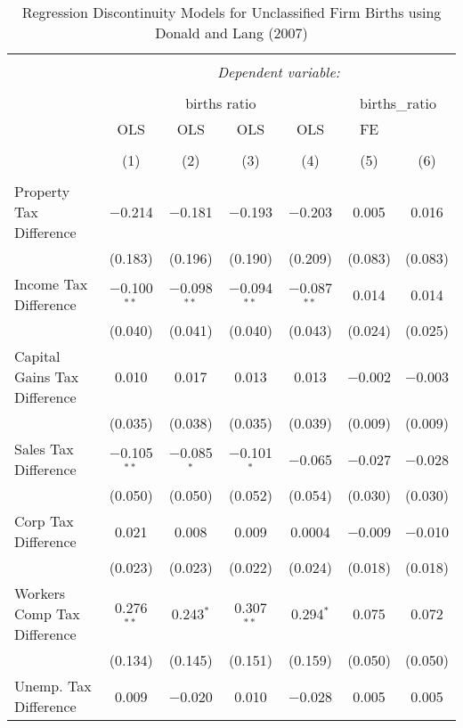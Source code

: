 
\begin{table}[!htbp] \centering 
  \caption{Regression Discontinuity Models for  Unclassified Firm Births using Donald and Lang (2007)} 
  \label{} 
\begin{tabular}{@{\extracolsep{5pt}}lcccccc} 
\\[-1.8ex]\hline 
\hline \\[-1.8ex] 
 & \multicolumn{6}{c}{\textit{Dependent variable:}} \\ 
\cline{2-7} 
\\[-1.8ex] & \multicolumn{4}{c}{births ratio} & \multicolumn{2}{c}{births\_ratio} \\ 
 & OLS & OLS & OLS & OLS & FE &  \\ 
\\[-1.8ex] & (1) & (2) & (3) & (4) & (5) & (6)\\ 
\hline \\[-1.8ex] 
 Property Tax Difference & $-$0.214 & $-$0.181 & $-$0.193 & $-$0.203 & 0.005 & 0.016 \\ 
  & (0.183) & (0.196) & (0.190) & (0.209) & (0.083) & (0.083) \\ 
  Income Tax Difference & $-$0.100$^{**}$ & $-$0.098$^{**}$ & $-$0.094$^{**}$ & $-$0.087$^{**}$ & 0.014 & 0.014 \\ 
  & (0.040) & (0.041) & (0.040) & (0.043) & (0.024) & (0.025) \\ 
  Capital Gains Tax Difference & 0.010 & 0.017 & 0.013 & 0.013 & $-$0.002 & $-$0.003 \\ 
  & (0.035) & (0.038) & (0.035) & (0.039) & (0.009) & (0.009) \\ 
  Sales Tax Difference & $-$0.105$^{**}$ & $-$0.085$^{*}$ & $-$0.101$^{*}$ & $-$0.065 & $-$0.027 & $-$0.028 \\ 
  & (0.050) & (0.050) & (0.052) & (0.054) & (0.030) & (0.030) \\ 
  Corp Tax Difference & 0.021 & 0.008 & 0.009 & 0.0004 & $-$0.009 & $-$0.010 \\ 
  & (0.023) & (0.023) & (0.022) & (0.024) & (0.018) & (0.018) \\ 
  Workers Comp Tax Difference & 0.276$^{**}$ & 0.243$^{*}$ & 0.307$^{**}$ & 0.294$^{*}$ & 0.075 & 0.072 \\ 
  & (0.134) & (0.145) & (0.151) & (0.159) & (0.050) & (0.050) \\ 
  Unemp. Tax Difference & 0.009 & $-$0.020 & 0.010 & $-$0.028 & 0.005 & 0.005 \\ 

\end{tabular}
\end{table}

